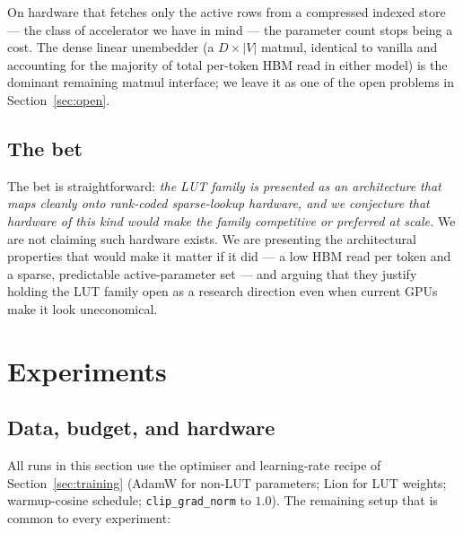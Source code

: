 \documentclass[11pt]{article}
\begin{document}
On hardware that fetches only the active rows from a compressed indexed store --- the class of accelerator we have in mind --- the parameter count stops being a cost. The dense linear unembedder (a $D \times |V|$ matmul, identical to vanilla and accounting for the majority of total per-token HBM read in either model) is the dominant remaining matmul interface; we leave it as one of the open problems in Section~\ref{sec:open}.

\subsection{The bet}

The bet is straightforward: \emph{the LUT family is presented as an architecture that maps cleanly onto rank-coded sparse-lookup hardware, and we conjecture that hardware of this kind would make the family competitive or preferred at scale.} We are not claiming such hardware exists. We are presenting the architectural properties that would make it matter if it did --- a low HBM read per token and a sparse, predictable active-parameter set --- and arguing that they justify holding the LUT family open as a research direction even when current GPUs make it look uneconomical.

\section{Experiments}
\label{sec:experiments}

\subsection{Data, budget, and hardware}
\label{ssec:exp-setup}

All runs in this section use the optimiser and learning-rate recipe of Section~\ref{sec:training} (AdamW for non-LUT parameters; Lion for LUT weights; warmup-cosine schedule; \texttt{clip\_grad\_norm} to $1.0$). The remaining setup that is common to every experiment:
\end{document}
